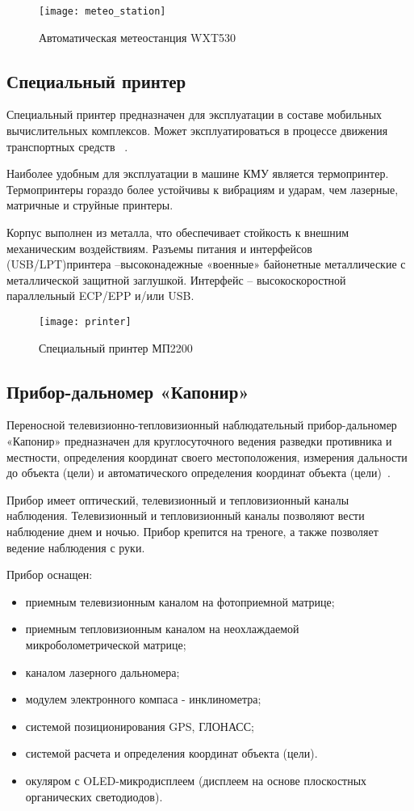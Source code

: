 \begin{figure}[ht]
	\centering
	\texttt{[image: meteo\_station]}
	\caption{Автоматическая метеостанция WXT530~\cite{wxt530}}
	\label{fig:lit_reiview:meteo:meteo_station}
\end{figure}

\subsection{Специальный принтер}
\label{sub:lit_review:spec_printer}
Специальный принтер предназначен для эксплуатации в составе мобильных вычислительных комплексов.
Может эксплуатироваться в процессе движения транспортных средств ~\cite{mp2200}.

Наиболее удобным для эксплуатации в машине КМУ является термопринтер. Термопринтеры гораздо более устойчивы к вибрациям и ударам, чем лазерные, матричные и струйные принтеры.

Корпус выполнен из металла, что обеспечивает стойкость к внешним механическим воздействиям.
Разъемы питания и интерфейсов (USB/LPT)\break принтера –высоконадежные «военные» байонетные металлические с металлической защитной заглушкой.
Интерфейс – высокоскоростной параллельный ECP/EPP и/или USB.

\begin{figure}[ht]
	\centering
	\texttt{[image: printer]}
	\caption{Специальный принтер МП2200~\cite{mp2200}}
	\label{fig:lit_reiview:spec_printer:printer}
\end{figure}

\subsection{Прибор-дальномер «Капонир»}
\label{sub:lit_review:kaponir}
Переносной телевизионно-тепловизионный наблюдательный прибор-дальномер «Капонир» предназначен для круглосуточного
ведения разведки противника и местности, определения координат своего местоположения, измерения дальности до объекта
(цели) и автоматического определения координат объекта (цели)~\cite{kaponir}.

Прибор имеет оптический, телевизионный и тепловизионный каналы наблюдения. Телевизионный и тепловизионный каналы позволяют
вести наблюдение днем и ночью. Прибор  крепится на треноге, а также  позволяет ведение наблюдения с руки.

Прибор оснащен:
\begin{itemize}
	\item приемным телевизионным каналом на фотоприемной матрице;
	\item приемным тепловизионным каналом на неохлаждаемой микроболометрической матрице;
	\item каналом лазерного дальномера;
	\item модулем электронного компаса - инклинометра;
	\item системой позиционирования GPS, ГЛОНАСС;
	\item системой расчета и определения координат объекта (цели).
	\item окуляром с OLED-микродисплеем (дисплеем на основе плоскостных органических светодиодов).
\end{itemize}

